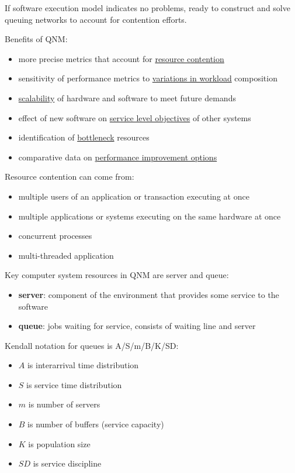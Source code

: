 \documentclass[11pt]{article}
\begin{document}
If software execution model indicates no problems, ready to construct and solve
queuing networks to account for contention efforts.

Benefits of QNM:
\begin{itemize}
\item more precise metrics that account for \uline{resource contention}
\item sensitivity of performance metrics to \uline{variations in workload} composition
\item \uline{scalability} of hardware and software to meet future demands
\item effect of new software on \uline{service level objectives} of other systems
\item identification of \uline{bottleneck} resources
\item comparative data on \uline{performance improvement options}
\end{itemize}

Resource contention can come from:
\begin{itemize}
\item multiple users of an application or transaction executing at once
\item multiple applications or systems executing on the same hardware at once
\item concurrent processes
\item multi-threaded application
\end{itemize}

Key computer system resources in QNM are server and queue:
\begin{itemize}
\item \textbf{server}: component of the environment that provides some service
to the software
\item \textbf{queue}: jobs waiting for service, consists of waiting line and server
\end{itemize}

Kendall notation for queues is A/S/m/B/K/SD:
\begin{itemize}
\item \(A\) is interarrival time distribution
\item \(S\) is service time distribution
\item \(m\) is number of servers
\item \(B\) is number of buffers (service capacity)
\item \(K\) is population size
\item \(SD\) is service discipline
\end{itemize}
\end{document}
